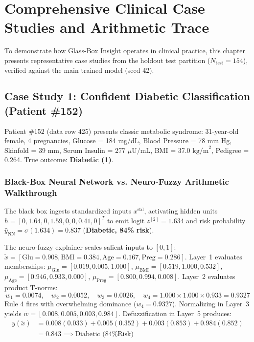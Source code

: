 \documentclass{report}
\begin{document}
\chapter{Comprehensive Clinical Case Studies and Arithmetic Trace}

To demonstrate how Glass-Box Insight operates in clinical practice, this chapter presents representative case studies from the holdout test partition ($N_{\text{test}} = 154$), verified against the main trained model (seed 42).

\section{Case Study 1: Confident Diabetic Classification (Patient \#152)}

Patient \#152 (data row 425) presents classic metabolic syndrome: 31-year-old female, 4 pregnancies, Glucose = 184 mg/dL, Blood Pressure = 78 mm Hg, Skinfold = 39 mm, Serum Insulin = 277 $\mu\text{U/mL}$, BMI = 37.0 $\text{kg/m}^2$, Pedigree = 0.264. True outcome: \textbf{Diabetic (1)}.

\subsection{Black-Box Neural Network vs. Neuro-Fuzzy Arithmetic Walkthrough}
The black box ingests standardized inputs $x^{\text{std}}$, activating hidden units $h = [0, 1.64, 0, 1.59, 0, 0, 0.41, 0]^T$ to emit logit $z^{[2]} = 1.634$ and risk probability $\hat{y}_{\text{NN}} = \sigma(1.634) = \mathbf{0.837}$ (\textbf{Diabetic, 84\% risk}).

The neuro-fuzzy explainer scales salient inputs to $[0, 1]$: $\tilde{x} = [\text{Glu} = 0.908, \text{BMI} = 0.384, \text{Age} = 0.167, \text{Preg} = 0.286]$. Layer~1 evaluates memberships: $\mu_{\text{Glu}} = [0.019, 0.005, \mathbf{1.000}]$, $\mu_{\text{BMI}} = [0.519, \mathbf{1.000}, 0.532]$, $\mu_{\text{Age}} = [0.946, 0.933, 0.000]$, $\mu_{\text{Preg}} = [0.800, 0.994, 0.008]$. Layer~2 evaluates product T-norms:
\begin{equation}
    w_1 = 0.0074, \quad w_2 = 0.0052, \quad w_3 = 0.0026, \quad w_4 = 1.000 \times 1.000 \times 0.933 = \mathbf{0.9327}
\end{equation}
Rule 4 fires with overwhelming dominance ($w_4 = 0.9327$). Normalizing in Layer~3 yields $\bar{w} = [0.008, 0.005, 0.003, \mathbf{0.984}]$. Defuzzification in Layer~5 produces:
\begin{align}
    y(\tilde{x}) &= 0.008(0.033) + 0.005(0.352) + 0.003(0.853) + 0.984(0.852) \\
    &= \mathbf{0.843} \implies \text{Diabetic (84\% Risk)}
\end{align}
\end{document}
